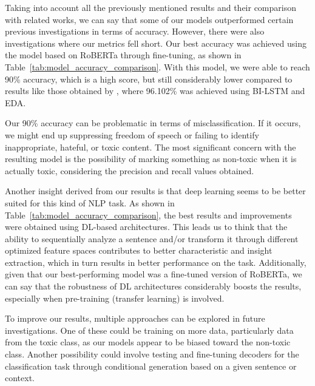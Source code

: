 Taking into account all the previously mentioned results and their comparison with related works, we can say that some of our models outperformed certain previous investigations in terms of accuracy. However, there were also investigations where our metrics fell short. Our best accuracy was achieved using the model based on RoBERTa through fine-tuning, as shown in Table~\ref{tab:model_accuracy_comparison}. With this model, we were able to reach 90\% accuracy, which is a high score, but still considerably lower compared to results like those obtained by \citep{fieri2023offensive}, where 96.102\% was achieved using BI-LSTM and EDA.

Our 90\% accuracy can be problematic in terms of misclassification. If it occurs, we might end up suppressing freedom of speech or failing to identify inappropriate, hateful, or toxic content. The most significant concern with the resulting model is the possibility of marking something as non-toxic when it is actually toxic, considering the precision and recall values obtained.

Another insight derived from our results is that deep learning seems to be better suited for this kind of NLP task. As shown in Table~\ref{tab:model_accuracy_comparison}, the best results and improvements were obtained using DL-based architectures. This leads us to think that the ability to sequentially analyze a sentence and/or transform it through different optimized feature spaces contributes to better characteristic and insight extraction, which in turn results in better performance on the task. Additionally, given that our best-performing model was a fine-tuned version of RoBERTa, we can say that the robustness of DL architectures considerably boosts the results, especially when pre-training (transfer learning) is involved.

To improve our results, multiple approaches can be explored in future investigations. One of these could be training on more data, particularly data from the toxic class, as our models appear to be biased toward the non-toxic class. Another possibility could involve testing and fine-tuning decoders for the classification task through conditional generation based on a given sentence or context.

